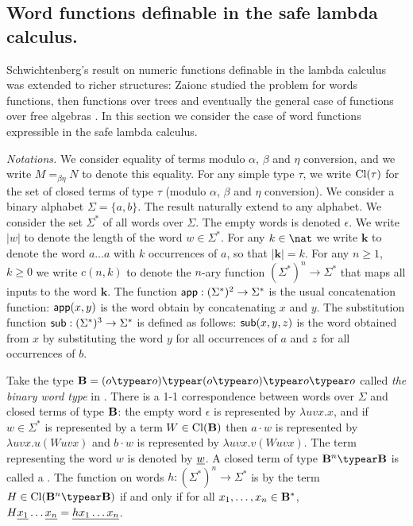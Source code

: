 \newcommand\wordnum[1]{\mathbf{#1}} %
\newcommand\safedefset{$\lambda^{safe}${\rm def}}

\newcommand\fatlambda{\lambda\kern-0.7em\lambda}
\newcommand\wordapp{{\sf app}}
\newcommand\wordsub{{\sf sub}}


\subsection{Word functions definable in the safe lambda calculus.}
Schwichtenberg's result on numeric functions definable in the lambda
calculus was extended to richer structures: Zaionc studied the
problem for words functions, then functions over trees and
eventually the general case of functions over free algebras
\cite{DBLP:journals/tcs/Leivant93,DBLP:journals/apal/Zaionc91,702481,DBLP:journals/tcs/Zaionc87,
zaionc:csl94}. In this section we consider the case of word
functions expressible in the safe lambda calculus.
\smallskip

\emph{Notations.} We consider equality of terms modulo $\alpha$,
$\beta$ and $\eta$ conversion, and we write $M=_{\beta\eta} N$ to
denote this equality. For any simple type $\tau$, we write
${\rm Cl}(\tau)$ for the set of closed terms of type $\tau$ (modulo
$\alpha$, $\beta$ and $\eta$ conversion). We consider a binary
alphabet $\Sigma = \{a,b\}$. The result naturally extend to any
alphabet. We consider the set $\Sigma^*$ of all words over $\Sigma$.
The empty words is denoted $\epsilon$. We write $|w|$ to denote the
length of the word $w\in\Sigma^*$. For any $k\in \nat$ we write
$\wordnum{k}$ to denote the word $a \ldots a$ with $k$ occurrences
of $a$, so that $|\wordnum{k}| = k$. For any $n\geq 1$, $k\geq 0$ we
write $c(n,k)$ to denote the $n$-ary function $(\Sigma^*)^n
\rightarrow \Sigma^*$ that maps all inputs to the word
$\wordnum{k}$. The function $\wordapp : (\Sigma^*)^2 \rightarrow
\Sigma^*$ is the usual concatenation function: $\wordapp(x,y)$ is
the word obtain by concatenating $x$ and $y$. The substitution
function $\wordsub : (\Sigma^*)^3 \rightarrow \Sigma^*$ is defined
as follows: $\wordsub(x,y,z)$ is the word obtained from $x$ by
substituting the word $y$ for all occurrences of $a$ and $z$ for all
occurrences of $b$.

Take the type $\zaiwordtyp = (o\typear o)\typear (o\typear o)\typear
o\typear o$ called \emph{the binary word type} in
\cite{DBLP:journals/tcs/Zaionc87}. There is a 1-1 correspondence
between words over $\Sigma$ and closed terms of type $\mathbf{B}$:
the empty word $\epsilon$ is represented by $\lambda u v x.x$, and
if $w\in \Sigma^*$ is represented by a term $W \in
{\rm Cl}(\mathbf{B})$ then $a \cdot w$ is represented by $\lambda
u v x. u(W uvx)$ and $b \cdot w$ is represented by $\lambda u v x.
v(W uvx)$. The term representing the word $w$ is denoted by
$\underline{w}$. A closed term of type $\zaiwordtyp^n \typear
\zaiwordtyp$ is called a . The function on
words $h:(\Sigma^*)^n \rightarrow \Sigma^*$ is
 by the term $H \in \closedof{\zaiwordtyp^n
\typear \zaiwordtyp}$ if and only if for all $x_1, \ldots, x_n \in
\mathbf{B}^*$, $H \underline{x_1} \ldots \underline{x_n} =
\underline{h x_1 \ldots x_n}$. \bigskip

